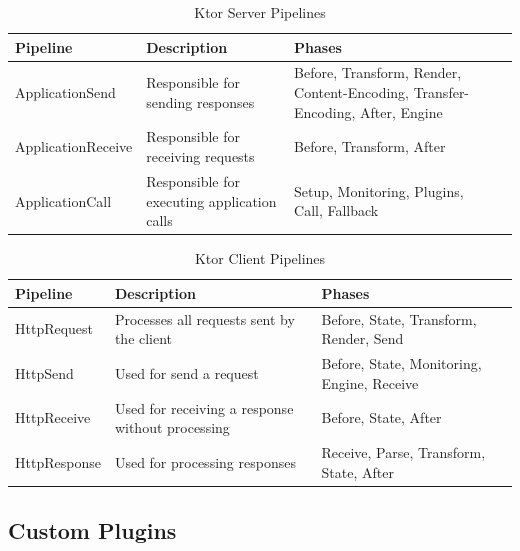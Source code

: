 \begin{table}[!htb]
    \centering
    \caption{Ktor Server Pipelines}
    \label{tab:ktor-server-pipelines}
    \vspace{0.3cm}
    \begin{tabular}{|l|p{6cm}|p{5cm}|p{5cm}|}
        \hline
        \textbf{Pipeline}  & \textbf{Description}                        & \textbf{Phases}                                                               \\ \hline
        ApplicationSend    & Responsible for sending responses           & Before, Transform, Render, Content-Encoding, Transfer-Encoding, After, Engine \\ \hline
        ApplicationReceive & Responsible for receiving requests          & Before, Transform, After                                                      \\ \hline
        ApplicationCall    & Responsible for executing application calls & Setup, Monitoring, Plugins, Call, Fallback                                    \\ \hline
    \end{tabular}
\end{table}

\begin{table}[!htb]
    \centering
    \caption{Ktor Client Pipelines}
    \label{tab:ktor-client-pipelines}
    \vspace{0.3cm}
    \begin{tabular}{|l|p{6cm}|p{5cm}|p{5cm}|}
        \hline
        \textbf{Pipeline} & \textbf{Description}                             & \textbf{Phases}                            \\ \hline
        HttpRequest       & Processes all requests sent by the client        & Before, State, Transform, Render, Send     \\ \hline
        HttpSend          & Used for send a request                          & Before, State, Monitoring, Engine, Receive \\ \hline
        HttpReceive       & Used for receiving a response without processing & Before, State, After                       \\ \hline
        HttpResponse      & Used for processing responses                    & Receive, Parse, Transform, State, After    \\ \hline
    \end{tabular}
\end{table}

\subsection{Custom Plugins}\label{subsec:custom-plugins}

